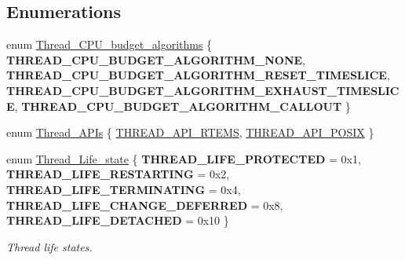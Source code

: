 \subsection*{Enumerations}
\begin{DoxyCompactItemize}
\item 
enum \mbox{\hyperlink{group__RTEMSScoreThread_gab6f48556812ffc781a69df144ef49be0}{Thread\+\_\+\+C\+P\+U\+\_\+budget\+\_\+algorithms}} \{ {\bfseries T\+H\+R\+E\+A\+D\+\_\+\+C\+P\+U\+\_\+\+B\+U\+D\+G\+E\+T\+\_\+\+A\+L\+G\+O\+R\+I\+T\+H\+M\+\_\+\+N\+O\+NE}, 
{\bfseries T\+H\+R\+E\+A\+D\+\_\+\+C\+P\+U\+\_\+\+B\+U\+D\+G\+E\+T\+\_\+\+A\+L\+G\+O\+R\+I\+T\+H\+M\+\_\+\+R\+E\+S\+E\+T\+\_\+\+T\+I\+M\+E\+S\+L\+I\+CE}, 
{\bfseries T\+H\+R\+E\+A\+D\+\_\+\+C\+P\+U\+\_\+\+B\+U\+D\+G\+E\+T\+\_\+\+A\+L\+G\+O\+R\+I\+T\+H\+M\+\_\+\+E\+X\+H\+A\+U\+S\+T\+\_\+\+T\+I\+M\+E\+S\+L\+I\+CE}, 
{\bfseries T\+H\+R\+E\+A\+D\+\_\+\+C\+P\+U\+\_\+\+B\+U\+D\+G\+E\+T\+\_\+\+A\+L\+G\+O\+R\+I\+T\+H\+M\+\_\+\+C\+A\+L\+L\+O\+UT}
 \}
\item 
enum \mbox{\hyperlink{group__RTEMSScoreThread_gaf87b9c0fbba9460ccb284584454c5280}{Thread\+\_\+\+A\+P\+Is}} \{ \mbox{\hyperlink{group__RTEMSScoreThread_ggaf87b9c0fbba9460ccb284584454c5280abe3da3f1c02de606c8ff1488564a0a73}{T\+H\+R\+E\+A\+D\+\_\+\+A\+P\+I\+\_\+\+R\+T\+E\+MS}}, 
\mbox{\hyperlink{group__RTEMSScoreThread_ggaf87b9c0fbba9460ccb284584454c5280a643780b2fad6bb2de6b6688b2f2423cc}{T\+H\+R\+E\+A\+D\+\_\+\+A\+P\+I\+\_\+\+P\+O\+S\+IX}}
 \}
\item 
enum \mbox{\hyperlink{group__RTEMSScoreThread_ga0b4c61e432a0c21855e3122bb394583d}{Thread\+\_\+\+Life\+\_\+state}} \{ \newline
{\bfseries T\+H\+R\+E\+A\+D\+\_\+\+L\+I\+F\+E\+\_\+\+P\+R\+O\+T\+E\+C\+T\+ED} = 0x1, 
{\bfseries T\+H\+R\+E\+A\+D\+\_\+\+L\+I\+F\+E\+\_\+\+R\+E\+S\+T\+A\+R\+T\+I\+NG} = 0x2, 
{\bfseries T\+H\+R\+E\+A\+D\+\_\+\+L\+I\+F\+E\+\_\+\+T\+E\+R\+M\+I\+N\+A\+T\+I\+NG} = 0x4, 
{\bfseries T\+H\+R\+E\+A\+D\+\_\+\+L\+I\+F\+E\+\_\+\+C\+H\+A\+N\+G\+E\+\_\+\+D\+E\+F\+E\+R\+R\+ED} = 0x8, 
\newline
{\bfseries T\+H\+R\+E\+A\+D\+\_\+\+L\+I\+F\+E\+\_\+\+D\+E\+T\+A\+C\+H\+ED} = 0x10
 \}
\begin{DoxyCompactList}\small\item\em Thread life states. \end{DoxyCompactList}\end{DoxyCompactItemize}

